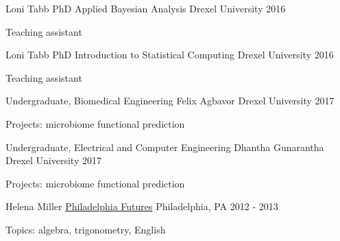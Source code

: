 \begin{cventries}
\cventry
    {Loni Tabb PhD}
    {Applied Bayesian Analysis}
    {Drexel University}
    {2016}
    {\begin{cvitems}
        \item Teaching assistant
    \end{cvitems}}
    
\cventry
    {Loni Tabb PhD}
    {Introduction to Statistical Computing}
    {Drexel University}
    {2016}
    {\begin{cvitems}
        \item Teaching assistant
    \end{cvitems}}
    
\end{cventries}


\begin{cventries}

\cventry
    {Undergraduate, Biomedical Engineering}
    {Felix Agbavor}
    {Drexel University}
    {2017}
    {\begin{cvitems}
        \item Projects: microbiome functional prediction
    \end{cvitems}}

\cventry
    {Undergraduate, Electrical and Computer Engineering}
    {Dhantha Gunarantha}
    {Drexel University}
    {2017}
    {\begin{cvitems}
        \item Projects: microbiome functional prediction
    \end{cvitems}}
    
\end{cventries}


\begin{cventries}
    
\cventry
    {Helena Miller}
    {\href{https://philadelphiafutures.org/}{Philadelphia Futures}}
    {Philadelphia, PA}
    {2012 - 2013}
    {\begin{cvitems}
        \item Topics: algebra, trigonometry, English 
    \end{cvitems}}

\end{cventries}
    




